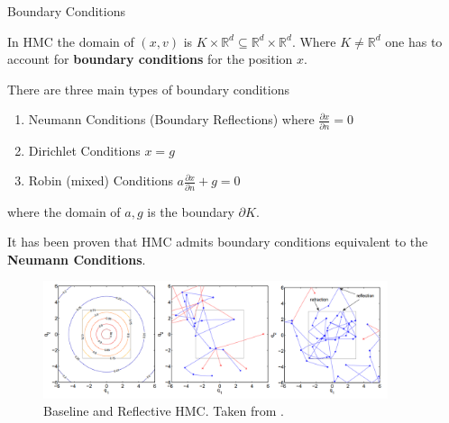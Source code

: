 \documentclass[10pt]{beamer}
\begin{document}
\begin{frame}[allowframebreaks]{Boundary Conditions}

    In HMC the domain of $(x, v)$ is $K \times \mathbb R^d \subseteq \mathbb R^d \times \mathbb R^d$. Where $K \neq \mathbb R^d$ one has to account for \textbf{boundary conditions} for the position $x$. 
    
    
    \medskip
    
    There are three main types of boundary conditions
    
    \begin{enumerate}
        \item Neumann Conditions (Boundary Reflections) where $\frac {\partial x} {\partial n} = 0$
        \item Dirichlet Conditions $x = g$
        \item Robin (mixed) Conditions $a \frac {\partial x} {\partial n} + g = 0$
    \end{enumerate} 
    
    where the domain of $a, g$ is the boundary $\partial K$. 
    
    It has been proven \cite{pakman2014exact} that HMC admits boundary conditions equivalent to the \textbf{Neumann Conditions}.
    
    \framebreak
    
    \begin{figure}
        \centering
        \includegraphics[width=0.9\textwidth]{publications/presentations/log_concave_sampling/reflection.png}
        \caption{Baseline and Reflective HMC. Taken from \cite{afshar2015reflection}.} 
        \label{fig:reflection}
    \end{figure}

\end{frame}
\end{document}
